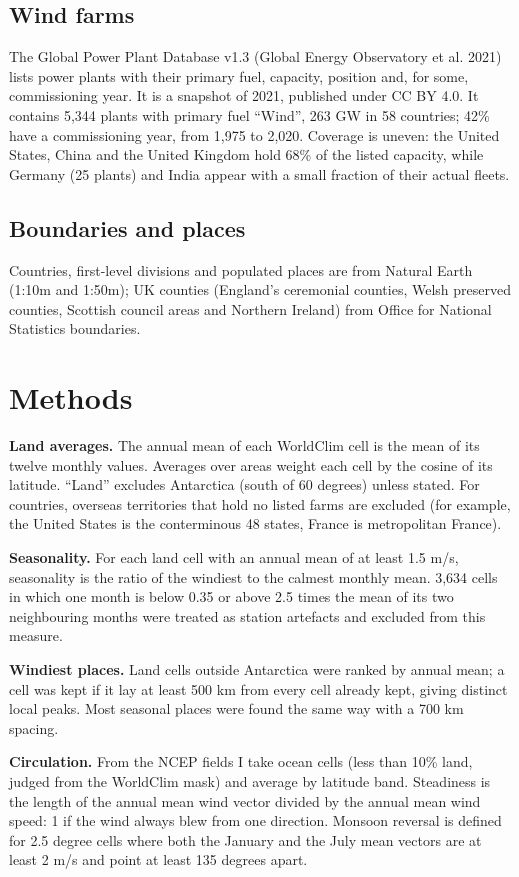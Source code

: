 \documentclass[11pt,a4paper]{article}
\begin{document}
\subsection{Wind farms}
The Global Power Plant Database v1.3 (Global Energy Observatory et al. 2021) lists power plants with their primary fuel, capacity, position and, for some, commissioning year. It is a snapshot of 2021, published under CC BY 4.0. It contains 5,344 plants with primary fuel ``Wind'', 263 GW in 58 countries; 42\% have a commissioning year, from 1,975 to 2,020. Coverage is uneven: the United States, China and the United Kingdom hold 68\% of the listed capacity, while Germany (25 plants) and India appear with a small fraction of their actual fleets.

\subsection{Boundaries and places}
Countries, first-level divisions and populated places are from Natural Earth (1:10m and 1:50m); UK counties (England's ceremonial counties, Welsh preserved counties, Scottish council areas and Northern Ireland) from Office for National Statistics boundaries.

\section{Methods}

\textbf{Land averages.} The annual mean of each WorldClim cell is the mean of its twelve monthly values. Averages over areas weight each cell by the cosine of its latitude. ``Land'' excludes Antarctica (south of 60 degrees) unless stated. For countries, overseas territories that hold no listed farms are excluded (for example, the United States is the conterminous 48 states, France is metropolitan France).

\textbf{Seasonality.} For each land cell with an annual mean of at least 1.5 m/s, seasonality is the ratio of the windiest to the calmest monthly mean. 3,634 cells in which one month is below 0.35 or above 2.5 times the mean of its two neighbouring months were treated as station artefacts and excluded from this measure.

\textbf{Windiest places.} Land cells outside Antarctica were ranked by annual mean; a cell was kept if it lay at least 500 km from every cell already kept, giving distinct local peaks. Most seasonal places were found the same way with a 700 km spacing.

\textbf{Circulation.} From the NCEP fields I take ocean cells (less than 10\% land, judged from the WorldClim mask) and average by latitude band. Steadiness is the length of the annual mean wind vector divided by the annual mean wind speed: 1 if the wind always blew from one direction. Monsoon reversal is defined for 2.5 degree cells where both the January and the July mean vectors are at least 2 m/s and point at least 135 degrees apart.
\end{document}

